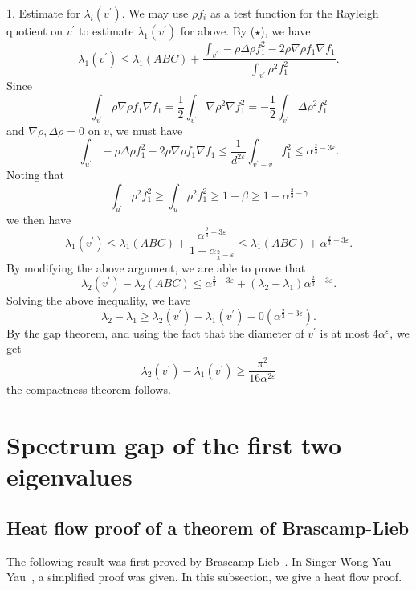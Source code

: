 1. Estimate for $ \lambda _i (v ^\prime) $. We may use $ \rho f_i $ as a test function for the Rayleigh quotient on $ v ^\prime $ to estimate $ \lambda _1 (v^\prime) $ for above. By ($\star$), we have 
%
\[\lambda_1 (v ^\prime) \leq \lambda _1 (ABC) + \frac{\int_{v^{\prime}} - \rho \Delta \rho f _1^2 - 2 \rho \nabla \rho f _1 \nabla f_1}{\int _{v^{\prime}} \rho ^2 f ^2_1} .\]
%
Since 
%
\[ \int _{v^{\prime}} \rho \nabla \rho f _1 \nabla f_1 = \frac{1}{2} \int _{v^{\prime}} \nabla \rho^2 \nabla f_1^2 = - \frac{1}{2} \int _{v^{\prime}} \Delta \rho^2   f_1^2\]
%
and $ \nabla \rho, \Delta \rho = 0 $ on $ v $, we must have 
%
\[ \int _{u^{\prime}} -\rho \Delta \rho f _1^2 - 2  \rho\nabla \rho f_1  \nabla f _1 \leq  \frac{1}{d^{2 \varepsilon}} \int _{v^{\prime} - v}   f _1^2 \leq  \alpha ^{\frac{2}{3} - 3 \varepsilon}.\]
%
Noting that 
%
\[\int _{u^{\prime}}  \rho ^2 f ^2_1 \geq \int_u \rho^2 f ^2_1 \geq 1 - \beta \geq 1 - \alpha ^{\frac{2}{3} - \gamma}\]
%
we then have
\[ \lambda _1 (v^\prime) \leq \lambda _1 (ABC) + \frac{\alpha ^{\frac{2}{3} - 3 \varepsilon}}{1 - \alpha _{\frac{2}{3} - \varepsilon}} \leq \lambda _1 (ABC) + \alpha ^{ \frac{2}{3} -  3 \varepsilon}. \]
%
By modifying the above argument, we are able to prove that 
%
\[ \lambda _2 (v ^\prime) - \lambda _2 (ABC) \leq \alpha ^{ \frac{2}{3} -  3 \varepsilon}  + ( \lambda _2 - \lambda _1) \alpha ^{ \frac{2}{3} -  3 \varepsilon}.  \]
%
Solving the above inequality, we have 
%
\[ \lambda _2 - \lambda _1 \geq \lambda _2 (v ^\prime) - \lambda _1 ( v ^\prime) - 0 (\alpha ^{ \frac{2}{3} -  3 \varepsilon} ).\]
%
By the gap theorem, and using the fact that the diameter of $ v ^\prime $ is at most $ 4 \alpha ^\varepsilon $, we get 
%
\[ \lambda _2  (v ^\prime) - \lambda _1 ( v ^\prime)  \geq \frac{\pi^2}{16 \alpha ^{2 \varepsilon}}\]
the compactness theorem follows.

\section{Spectrum gap of the first two eigenvalues}\label{Spectrum_gap}

\subsection{Heat flow proof of a theorem of Brascamp-Lieb}
The following result was first proved by Brascamp-Lieb~\cite{blieb}. In Singer-Wong-Yau-Yau~\cite{swyy}, a simplified proof was given.
In this subsection, we give a heat flow proof.

